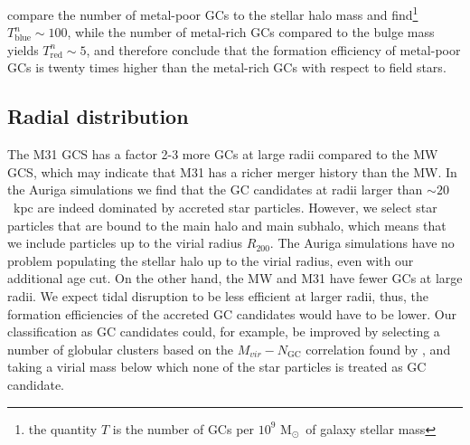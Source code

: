 \documentclass[a4paper,fleqn,usenatbib]{mnras}
\newcommand{\Sun}[0]{\ensuremath{_{\odot}}}
\begin{document}
\citet{2006ARA&A..44..193B} compare the number of metal-poor GCs to the stellar
halo mass and find\footnote{the quantity $T$ is the number of GCs per $10^9$ M\Sun \,
of galaxy stellar mass} $T^n_{\text{blue}} \sim 100$, while the
number of metal-rich GCs compared to the bulge mass yields $T^n_{\text{red}} \sim 5$,
and therefore conclude that the formation efficiency of metal-poor GCs is
twenty times higher than the metal-rich GCs with respect to field stars.



\subsection{Radial distribution}
\label{sec:discussion_Rgc}
The M31 GCS has a factor 2-3 more GCs at large radii compared to the MW GCS,
which may indicate that M31 has a richer merger history than the MW. In the
Auriga simulations we find that the GC candidates at radii larger than
$\sim20$~kpc are indeed dominated by accreted star particles. However, we select
star particles that are bound to the main halo and main subhalo, which means that
we include particles up to the virial radius $R_{200}$. The Auriga simulations
have no problem populating the stellar halo up to the virial radius, even with
our additional age cut. On the other hand, the MW and M31 have fewer GCs at large
radii. We expect tidal disruption to be less efficient at larger radii, thus,
the formation efficiencies of the accreted GC candidates would have to be lower.
Our classification as GC candidates could, for example, be improved by selecting
a number of globular clusters based on the $M_{vir}-N_{\text{GC}}$ correlation
found by \citet{2019arXiv190100900B}, and taking a virial mass below which none
of the star particles is treated as GC candidate.

\end{document}
